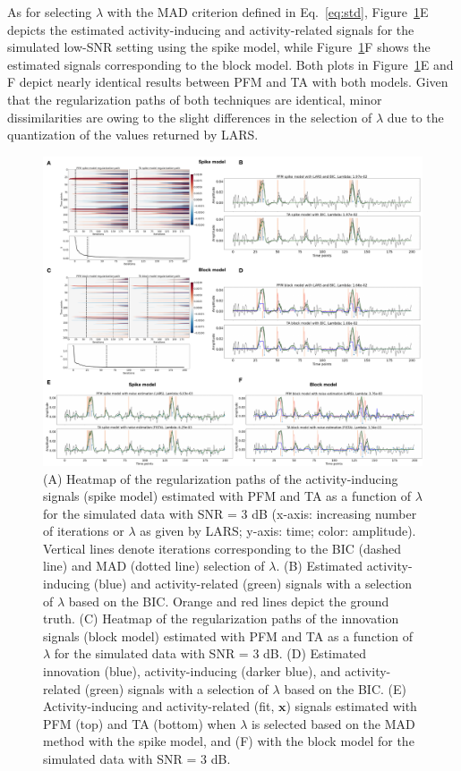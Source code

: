 As for selecting $\lambda$ with the MAD criterion defined in Eq.~\eqref{eq:std}, Figure~\ref{fig:sim}E depicts the estimated activity-inducing and activity-related signals for the simulated low-SNR setting using the spike model, while Figure~\ref{fig:sim}F shows the estimated signals corresponding to the block model. Both plots in Figure~\ref{fig:sim}E and F depict nearly identical results between PFM and TA with both models. Given that the regularization paths of both techniques are identical, minor dissimilarities are owing to the slight differences in the selection of $\lambda$ due to the quantization of the values returned by LARS.

\begin{figure}[t!]
    \begin{center}
        \includegraphics[width=\textwidth]{figures/figure_sim.pdf}
    \end{center}
    \caption{(A) Heatmap of the regularization paths of the activity-inducing signals (spike model) estimated with PFM and TA as a function of $\lambda$ for the simulated data with SNR = 3 dB (x-axis: increasing number of iterations or $\lambda$ as given by LARS; y-axis: time; color: amplitude). Vertical lines denote iterations corresponding to the BIC (dashed line) and MAD (dotted line) selection of $\lambda$. (B) Estimated activity-inducing (blue) and activity-related (green) signals with a selection of $\lambda$ based on the BIC. Orange and red lines depict the ground truth. (C) Heatmap of the regularization paths of the innovation signals (block model) estimated with PFM and TA as a function of $\lambda$ for the simulated data with SNR = 3 dB. (D) Estimated innovation (blue), activity-inducing (darker blue), and activity-related (green) signals with a selection of $\lambda$ based on the BIC. (E) Activity-inducing and activity-related (fit, $\mathbf{x}$) signals estimated with PFM (top) and TA (bottom) when $\lambda$ is selected based on the MAD method with the spike model, and (F) with the block model for the simulated data with SNR = 3 dB.}
\label{fig:sim}
\end{figure}

